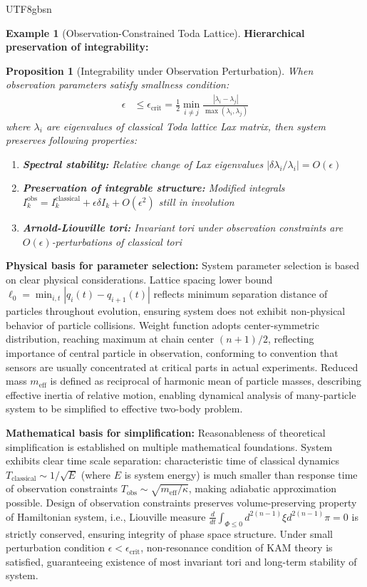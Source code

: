 \documentclass[a4paper,12pt]{extarticle}
\newtheorem{proposition}[theorem]{Proposition}
\theoremstyle{definition}
\newtheorem{example}{Example}
\begin{document}
\begin{CJK}{UTF8}{gbsn}
\begin{example}[Observation-Constrained Toda Lattice]
\textbf{Hierarchical preservation of integrability:}
\begin{proposition}[Integrability under Observation Perturbation]
When observation parameters satisfy smallness condition:
\begin{align*}
\epsilon &\leq \epsilon_{\text{crit}} = \frac{1}{2} \min_{i \neq j} \frac{|\lambda_i - \lambda_j|}{\max(\lambda_i, \lambda_j)}
\end{align*}
where $\lambda_i$ are eigenvalues of classical Toda lattice Lax matrix, then system preserves following properties:
\begin{enumerate}
\item \textbf{Spectral stability:} Relative change of Lax eigenvalues $|\delta\lambda_i/\lambda_i| = O(\epsilon)$
\item \textbf{Preservation of integrable structure:} Modified integrals $I_k^{\text{obs}} = I_k^{\text{classical}} + \epsilon \delta I_k + O(\epsilon^2)$ still in involution
\item \textbf{Arnold-Liouville tori:} Invariant tori under observation constraints are $O(\epsilon)$-perturbations of classical tori
\end{enumerate}
\end{proposition}
\textbf{Physical basis for parameter selection:}
System parameter selection is based on clear physical considerations. Lattice spacing lower bound $\ell_0 = \min_{i,t} |q_i(t) - q_{i+1}(t)|$ reflects minimum separation distance of particles throughout evolution, ensuring system does not exhibit non-physical behavior of particle collisions. Weight function adopts center-symmetric distribution, reaching maximum at chain center $(n+1)/2$, reflecting importance of central particle in observation, conforming to convention that sensors are usually concentrated at critical parts in actual experiments. Reduced mass $m_{\text{eff}}$ is defined as reciprocal of harmonic mean of particle masses, describing effective inertia of relative motion, enabling dynamical analysis of many-particle system to be simplified to effective two-body problem.

\textbf{Mathematical basis for simplification:}
Reasonableness of theoretical simplification is established on multiple mathematical foundations. System exhibits clear time scale separation: characteristic time of classical dynamics $T_{\text{classical}} \sim 1/\sqrt{E}$ (where $E$ is system energy) is much smaller than response time of observation constraints $T_{\text{obs}} \sim \sqrt{m_{\text{eff}}/\kappa}$, making adiabatic approximation possible. Design of observation constraints preserves volume-preserving property of Hamiltonian system, i.e., Liouville measure $\frac{d}{dt}\int_{\Phi \leq 0} d^{2(n-1)}\xi d^{2(n-1)}\pi = 0$ is strictly conserved, ensuring integrity of phase space structure. Under small perturbation condition $\epsilon < \epsilon_{\text{crit}}$, non-resonance condition of KAM theory is satisfied, guaranteeing existence of most invariant tori and long-term stability of system.


\end{example}
\end{CJK}
\end{document}
